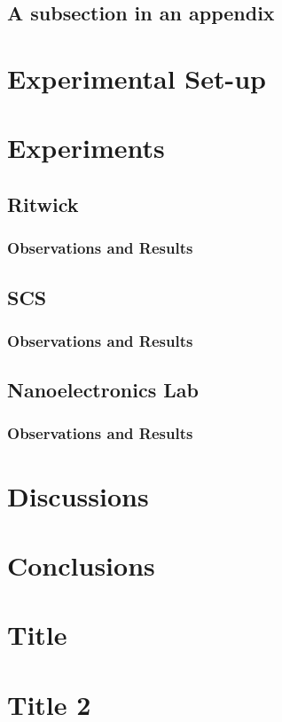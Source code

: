 \documentclass[%
 reprint,
 amsmath,amssymb,
 aps,
]{revtex4-2}
\begin{document}
	\subsection{\label{app:subsec}A subsection in an appendix}
		\lipsum[12-15]

\section{Experimental Set-up}
	\lipsum[16-18]

\section{Experiments}
	\lipsum[19]
	\subsection{Ritwick}
		\lipsum[20]
		\subsubsection{Observations and Results}
			\lipsum[21-25]
	\subsection{SCS}
		\lipsum[20]
		\subsubsection{Observations and Results}
			\lipsum[21-25]
	\subsection{Nanoelectronics Lab}
		\lipsum[20]
		\subsubsection{Observations and Results}
			\lipsum[21-25]
		
\section{Discussions}
	\lipsum[26-30]
\section{Conclusions}
	\lipsum[31-33]


\appendix
\section{Title}
	\lipsum[34-36]
\section{Title 2}
	\lipsum[37-38]
\nocite{*}

\end{document}
